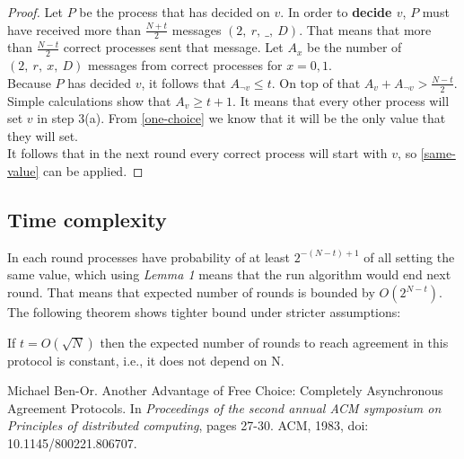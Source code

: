 \documentclass[12pt, a4paper]{article}
\begin{document}
\begin{proof}
Let $P$ be the process that has decided on $v$.
In order to \textbf{decide $v$}, $P$ must have received more than $\frac{N+t}{2}$ messages $(2,\ r,\ \_,\ D)$. That means that more than $\frac{N-t}{2}$ correct processes sent that message. Let $A_x$ be the number of $(2,\ r,\ x,\ D)$ messages from correct processes for $x=0,1$.\\
Because $P$ has decided $v$, it follows that $A_{\neg v}\leq t$. On top of that $A_v+A_{\neg v}>\frac{N-t}{2}$.\\
Simple calculations show that $A_v\geq t+1$. It means that every other process will set $v$ in step 3(a). From \cref{one-choice} we know that it will be the only value that they will set.\\
It follows that in the next round every correct process will start with $v$, so \cref{same-value} can be applied.
\end{proof}
\subsection*{Time complexity}
In each round processes have probability of at least $2^{-(N-t)+1}$ of all setting the same value, which using \textit{Lemma 1} means that the run algorithm would end next round. That means that expected number of rounds is bounded by $O(2^{N-t})$.\\
The following theorem shows tighter bound under stricter assumptions:
\begin{theorem}\cite{Ben83}
If $t=O(\sqrt{N})$ then the expected number of rounds to reach agreement in this protocol is constant, i.e., it does not depend on N. 
\end{theorem}
\begin{thebibliography}{9}
 Michael Ben-Or. Another Advantage of Free Choice: Completely Asynchronous Agreement Protocols. In \textit{Proceedings of the second annual ACM symposium on Principles of distributed computing}, pages 27-30. ACM, 1983, doi: 10.1145/800221.806707.
\end{thebibliography}
\end{document}
